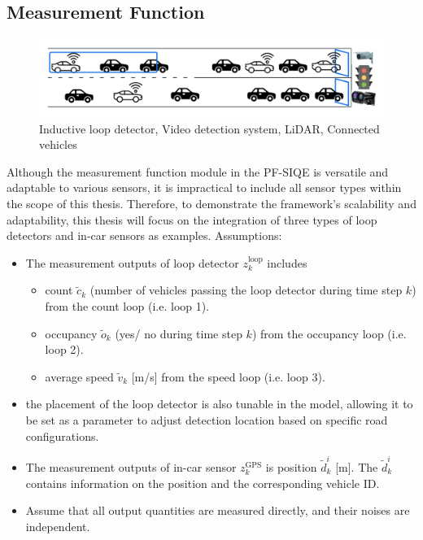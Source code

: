 \subsection{Measurement Function}\label{MF}
\begin{figure}[!htbp]
    \centering
    \includegraphics[width= 0.85\linewidth]{figures/sensors.png}
    \caption{Inductive loop detector, Video detection system, LiDAR, Connected vehicles}
    \label{fig: Loop detector position}
\end{figure}

Although the measurement function module in the PF-SIQE is versatile and adaptable to various sensors, it is impractical to include all sensor types within the scope of this thesis. Therefore, to demonstrate the framework's scalability and adaptability, this thesis will focus on the integration of three types of loop detectors and in-car sensors as examples. Assumptions:
\begin{itemize}
    \item The measurement outputs of loop detector $ z_k^\text{loop}$ includes
    \begin{itemize}
        \item count $\tilde c_k$ (number of vehicles passing the loop detector during time step $k$) from the count loop (i.e. loop 1). 
        \item occupancy $\tilde o_k$ (yes/ no during time step $k$) from the occupancy loop (i.e. loop 2). 
        \item average speed $\tilde v_k$ [m/s] from the speed loop (i.e. loop 3).
    \end{itemize}
    \item the placement of the loop detector is also tunable in the model, allowing it to be set as a parameter to adjust detection location based on specific road configurations.
    \item The measurement outputs of in-car sensor $z_k^\text{GPS}$ is position $\tilde d_k^i$ [m]. The $\tilde d_k^i$ contains information on the position and the corresponding vehicle ID.
    \item Assume that all output quantities are measured directly, and their noises are independent.
\end{itemize}


